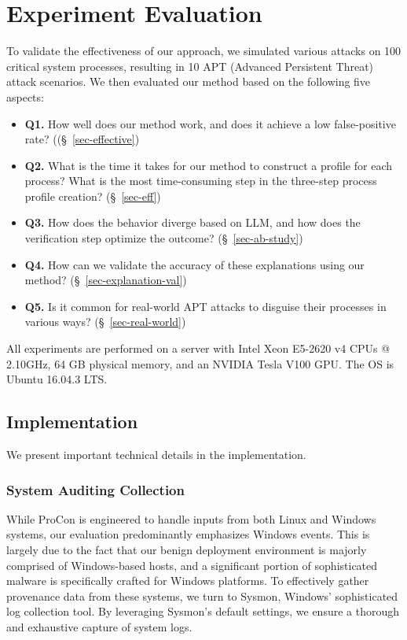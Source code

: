 \section{Experiment Evaluation}

To validate the effectiveness of our approach, we simulated various attacks on 100 critical system processes, resulting in 10 APT (Advanced Persistent Threat) attack scenarios. We then evaluated our method based on the following five aspects:

\begin{itemize}
    \item \textbf{Q1.} How well does our method work, and does it achieve a low false-positive rate? ((§~\ref{sec-effective})
    \item \textbf{Q2.} What is the time it takes for our method to construct a profile for each process? What is the most time-consuming step in the three-step process profile creation? (§~\ref{sec-eff})
    \item \textbf{Q3.} How does the behavior diverge based on LLM, and how does the verification step optimize the outcome? (§~\ref{sec-ab-study})
    \item \textbf{Q4.} How can we validate the accuracy of these explanations using our method? (§~\ref{sec-explanation-val})
    \item \textbf{Q5.} Is it common for real-world APT attacks to disguise their processes in various ways? (§~\ref{sec-real-world})
\end{itemize}
All experiments are performed on a server with Intel Xeon E5-2620 v4 CPUs @ 2.10GHz, 64 GB physical memory, and an NVIDIA Tesla V100 GPU. The OS is Ubuntu 16.04.3 LTS.


\subsection{Implementation}
We present important technical details in the implementation.

\subsubsection{System Auditing Collection}

While ProCon is engineered to handle inputs from both Linux and Windows systems, our evaluation predominantly emphasizes Windows events. This is largely due to the fact that our benign deployment environment is majorly comprised of Windows-based hosts, and a significant portion of sophisticated malware is specifically crafted for Windows platforms. To effectively gather provenance data from these systems, we turn to Sysmon, Windows' sophisticated log collection tool. By leveraging Sysmon's default settings, we ensure a thorough and exhaustive capture of system logs.

